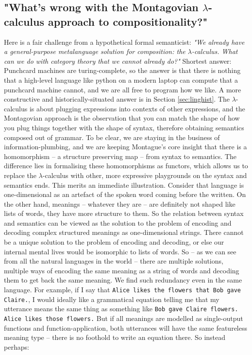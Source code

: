\subsection{"What's wrong with the Montagovian $\lambda$-calculus approach to compositionality?"}
Here is a fair challenge from a hypothetical formal semanticist: \emph{"We already have a general-purpose metalanguage solution for composition: the $\lambda$-calculus. What can we do with category theory that we cannot already do?"} Shortest answer: Punchcard machines are turing-complete, so the answer is that there is nothing that a high-level language like python on a modern laptop can compute that a punchcard machine cannot, and we are all free to program how we like. A more constructive and historically-situated answer is in Section \ref{sec:linghist}. The $\lambda$-calculus is about plugging expressions into contexts of other expressions, and the Montagovian approach is the observation that you can match the shape of how you plug things together with the shape of syntax, therefore obtaining semantics composed out of grammar. To be clear, we are staying in the business of information-plumbing, and we are keeping Montague's core insight that there is a homomorphism -- a structure preserving map -- from syntax to semantics. The difference lies in formalising these homomorphisms as functors, which allows us to replace the $\lambda$-calculus with other, more expressive playgrounds on the syntax and semantics ends. This merits an immediate illustration. Consider that language is one-dimensional as an artefact of the spoken word coming before the written. On the other hand, meanings -- whatever they are -- are definitely not shaped like lists of words, they have more structure to them. So the relation between syntax and semantics can be viewed as the solution to the problem of encoding and decoding complex structured meanings as one-dimensional strings. There cannot be a unique solution to the problem of encoding and decoding, or else our internal mental lives would be isomorphic to lists of words. So -- as we can see from all the natural languages in the world -- there are multiple solutions, multiple ways of encoding the same meaning as a string of words and decoding them to get back the same meaning. We find such redundancy even in the same language. For example, if I say that \texttt{Alice likes the flowers that Bob gave Claire.}, I would ideally like a grammatical equation telling me that my utterance means the same thing as something like \texttt{Bob gave Claire flowers. Alice likes those flowers.} But if all meanings are modelled as single-output functions and function-application, both utterances will have the same featureless meaning type -- there is no foothold to write an equation there. So instead perhaps:

